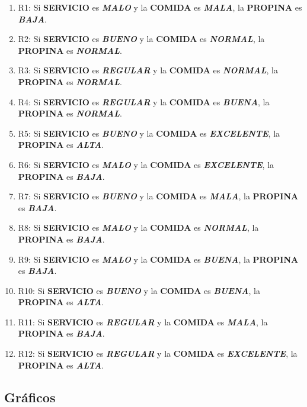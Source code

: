 \documentclass[11pt, letterpaper]{article}
\begin{document}
	\begin{enumerate}
		\item R1: Si \textbf{SERVICIO} es \textbf{\textit{MALO}} y la \textbf{COMIDA} es \textbf{\textit{MALA}}, la \textbf{PROPINA} es \textbf{\textit{BAJA}}.
		\item R2: Si \textbf{SERVICIO} es \textbf{\textit{BUENO}} y la \textbf{COMIDA} es \textbf{\textit{NORMAL}}, la \textbf{PROPINA} es \textbf{\textit{NORMAL}}.
		\item R3: Si \textbf{SERVICIO} es \textbf{\textit{REGULAR}} y la \textbf{COMIDA} es \textbf{\textit{NORMAL}}, la \textbf{PROPINA} es \textbf{\textit{NORMAL}}.
		\item R4: Si \textbf{SERVICIO} es \textbf{\textit{REGULAR}} y la \textbf{COMIDA} es \textbf{\textit{BUENA}}, la \textbf{PROPINA} es \textbf{\textit{NORMAL}}.
		\item R5: Si \textbf{SERVICIO} es \textbf{\textit{BUENO}} y la \textbf{COMIDA} es \textbf{\textit{EXCELENTE}}, la \textbf{PROPINA} es \textbf{\textit{ALTA}}.
		\item R6: Si \textbf{SERVICIO} es \textbf{\textit{MALO}} y la \textbf{COMIDA} es \textbf{\textit{EXCELENTE}}, la \textbf{PROPINA} es \textbf{\textit{BAJA}}.
		\item R7: Si \textbf{SERVICIO} es \textbf{\textit{BUENO}} y la \textbf{COMIDA} es \textbf{\textit{MALA}}, la \textbf{PROPINA} es \textbf{\textit{BAJA}}.
		\item R8: Si \textbf{SERVICIO} es \textbf{\textit{MALO}} y la \textbf{COMIDA} es \textbf{\textit{NORMAL}}, la \textbf{PROPINA} es \textbf{\textit{BAJA}}.
		\item R9: Si \textbf{SERVICIO} es \textbf{\textit{MALO}} y la \textbf{COMIDA} es \textbf{\textit{BUENA}}, la \textbf{PROPINA} es \textbf{\textit{BAJA}}.
		\item R10: Si \textbf{SERVICIO} es \textbf{\textit{BUENO}} y la \textbf{COMIDA} es \textbf{\textit{BUENA}}, la \textbf{PROPINA} es \textbf{\textit{ALTA}}.
		\item R11: Si \textbf{SERVICIO} es \textbf{\textit{REGULAR}} y la \textbf{COMIDA} es \textbf{\textit{MALA}}, la \textbf{PROPINA} es \textbf{\textit{BAJA}}.
		\item R12: Si \textbf{SERVICIO} es \textbf{\textit{REGULAR}} y la \textbf{COMIDA} es \textbf{\textit{EXCELENTE}}, la \textbf{PROPINA} es \textbf{\textit{ALTA}}.
	\end{enumerate}
	
	
	\subsection{Gráficos}
	
\end{document}
